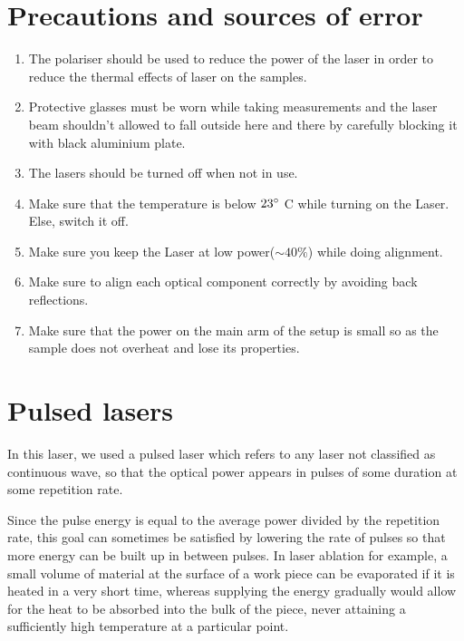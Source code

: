 \documentclass[%
 reprint,
 amsmath,amssymb,
 aps,
]{revtex4-2}
\begin{document}
\section{Precautions and sources of error}
	\begin{enumerate}
		\item The polariser should be used to reduce the power of the laser in order
		to reduce the thermal effects of laser on the samples.
		\item Protective glasses must be worn while taking measurements and the
		laser beam shouldn’t allowed to fall outside here and there by carefully
		blocking it with black aluminium plate.
		\item The lasers should be turned off when not in use.
		\item Make sure that the temperature is below $ 23 \degree $ C
		while turning on the Laser. Else, switch it off.
		\item Make sure you keep the Laser at low power($ \sim 40 \% $) while doing alignment.
		\item Make sure to align each optical component correctly by avoiding back reflections.
		\item Make sure that the power on the main arm of the
		setup is small so as the sample does not overheat
		and lose its properties.
	\end{enumerate}
	
	
	
\appendix
\section{Pulsed lasers}\label{pulsed}
	In this laser, we used a pulsed laser which refers to any laser not classified as continuous wave, so that the optical power appears in pulses of some duration at some repetition rate.
	\par 
	Since the pulse energy is equal to the average power divided by the repetition rate, this goal can sometimes be satisfied by lowering the rate of pulses so that more energy can be built up in between pulses. In laser ablation for example, a small volume of material at the surface of a work piece can be evaporated if it is heated in a very short time, whereas supplying the energy gradually would allow for the heat to be absorbed into the bulk of the piece, never attaining a sufficiently high temperature at a particular point.
\end{document}
